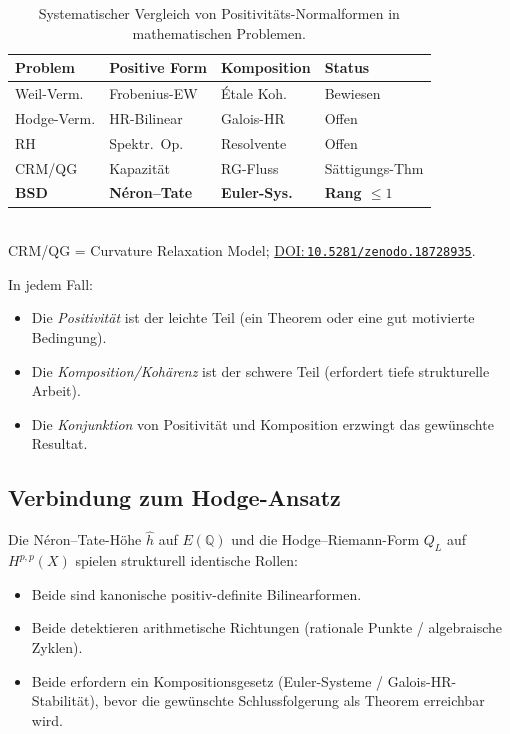 \documentclass[aps,prd,twocolumn,superscriptaddress,nofootinbib,floatfix]{revtex4-2}
\newcommand{\doilink}[1]{\href{https://doi.org/#1}{DOI:\,\nolinkurl{#1}}}
\theoremstyle{definition}
\theoremstyle{remark}
\begin{document}
\begin{table}[t]
\centering
\small
\caption{Systematischer Vergleich von Positivitäts-Normalformen in mathematischen Problemen.}
\label{tab:program_comparison}
\begin{tabular*}{\textwidth}{@{\extracolsep{\fill}}llll@{}}
\toprule
\textbf{Problem} & \textbf{Positive Form} & \textbf{Komposition} & \textbf{Status} \\
\midrule
Weil-Verm. & Frobenius-EW & Étale Koh. & Bewiesen \\
\addlinespace
Hodge-Verm. & HR-Bilinear & Galois-HR & Offen \\
\addlinespace
RH~\cite{GeigerRH2026c} & Spektr.\ Op. & Resolvente & Offen \\
\addlinespace
CRM/QG~\cite{FST-Unified2026} & Kapazität & RG-Fluss & Sättigungs-Thm \\
\addlinespace
\textbf{BSD} & \textbf{Néron--Tate} & \textbf{Euler-Sys.} & \textbf{Rang $\leq 1$} \\
\bottomrule
\end{tabular*}\\[4pt]
{\footnotesize CRM/QG = Curvature Relaxation Model; \doilink{10.5281/zenodo.18728935}.}
\end{table}

In jedem Fall:
\begin{itemize}
\item Die \textit{Positivität} ist der \glqq leichte\grqq{} Teil (ein Theorem oder eine gut motivierte Bedingung).
\item Die \textit{Komposition/Kohärenz} ist der \glqq schwere\grqq{} Teil (erfordert tiefe strukturelle Arbeit).
\item Die \textit{Konjunktion} von Positivität und Komposition erzwingt das gewünschte Resultat.
\end{itemize}

\subsection{Verbindung zum Hodge-Ansatz}

Die Néron--Tate-Höhe $\hat{h}$ auf $E(\mathbb{Q})$ und die Hodge--Riemann-Form $Q_L$ auf $H^{p,p}(X)$ spielen strukturell identische Rollen:
\begin{itemize}
\item Beide sind kanonische positiv-definite Bilinearformen.
\item Beide detektieren \glqq arithmetische Richtungen\grqq{} (rationale Punkte / algebraische Zyklen).
\item Beide erfordern ein \glqq Kompositionsgesetz\grqq{} (Euler-Systeme / Galois-HR-Stabilität), bevor die gewünschte Schlussfolgerung als Theorem erreichbar wird.
\end{itemize}
\end{document}
